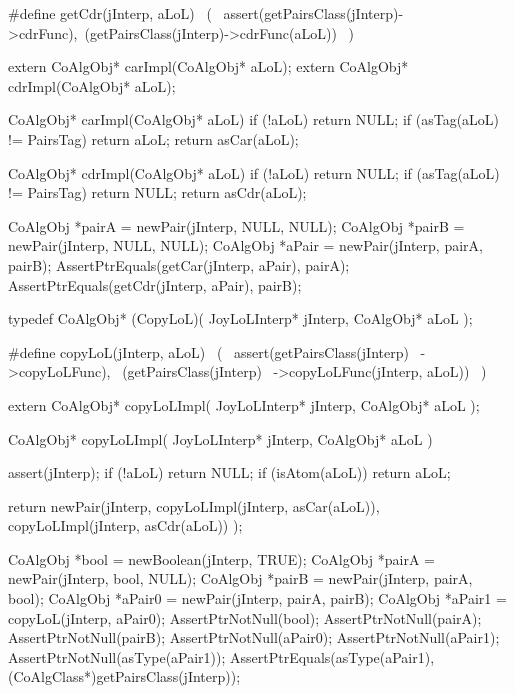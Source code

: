 #define getCdr(jInterp, aLoL)               \
  (                                         \
    assert(getPairsClass(jInterp)->cdrFunc),\
    (getPairsClass(jInterp)->cdrFunc(aLoL)) \
  )
\stopCHeader

\startCHeader
extern CoAlgObj* carImpl(CoAlgObj* aLoL);
extern CoAlgObj* cdrImpl(CoAlgObj* aLoL);
\stopCHeader
{}

\startCCode
CoAlgObj* carImpl(CoAlgObj* aLoL) {
  if (!aLoL) return NULL;
  if (asTag(aLoL) != PairsTag) return aLoL;
  return asCar(aLoL);
}

CoAlgObj* cdrImpl(CoAlgObj* aLoL) {
  if (!aLoL) return NULL;
  if (asTag(aLoL) != PairsTag) return NULL;
  return asCdr(aLoL);
}
\stopCCode


\startCTest
  CoAlgObj *pairA = newPair(jInterp, NULL, NULL);
  CoAlgObj *pairB = newPair(jInterp, NULL, NULL);
  CoAlgObj *aPair = newPair(jInterp, pairA, pairB);
  AssertPtrEquals(getCar(jInterp, aPair), pairA);
  AssertPtrEquals(getCdr(jInterp, aPair), pairB);
\stopCTest
\stopTestCase
\stopTestSuite

\startTestSuite[copyLoL]

\startCHeader
typedef CoAlgObj* (CopyLoL)(
  JoyLoLInterp* jInterp,
  CoAlgObj* aLoL
);

#define copyLoL(jInterp, aLoL)      \
  (                                 \
    assert(getPairsClass(jInterp)   \
      ->copyLoLFunc),               \
    (getPairsClass(jInterp)         \
      ->copyLoLFunc(jInterp, aLoL)) \
  )
\stopCHeader

\startCHeader
extern CoAlgObj* copyLoLImpl(
  JoyLoLInterp* jInterp,
  CoAlgObj* aLoL
);
\stopCHeader
{}

\startCCode
CoAlgObj* copyLoLImpl(
  JoyLoLInterp* jInterp,
  CoAlgObj* aLoL
) {
  assert(jInterp);
  if (!aLoL) return NULL;
  if (isAtom(aLoL)) return aLoL;

  return newPair(jInterp,
                 copyLoLImpl(jInterp, asCar(aLoL)),
                 copyLoLImpl(jInterp, asCdr(aLoL))
                 );
}
\stopCCode


\startCTest
  CoAlgObj *bool   = newBoolean(jInterp, TRUE);
  CoAlgObj *pairA  = newPair(jInterp, bool, NULL);
  CoAlgObj *pairB  = newPair(jInterp, pairA, bool);
  CoAlgObj *aPair0 = newPair(jInterp, pairA, pairB);
  CoAlgObj *aPair1 = copyLoL(jInterp, aPair0);
  AssertPtrNotNull(bool);
  AssertPtrNotNull(pairA);
  AssertPtrNotNull(pairB);
  AssertPtrNotNull(aPair0);
  AssertPtrNotNull(aPair1);
  AssertPtrNotNull(asType(aPair1));
  AssertPtrEquals(asType(aPair1),
    (CoAlgClass*)getPairsClass(jInterp));

